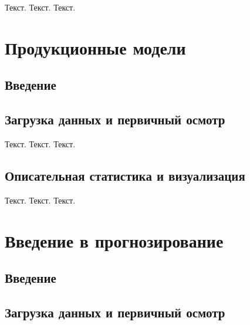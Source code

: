 \documentclass[
  letterpaper,
  DIV=11,
  numbers=noendperiod]{scrreprt}
\begin{document}
Текст. Текст. Текст.


\chapter{Продукционные
модели}\label{ux43fux440ux43eux434ux443ux43aux446ux438ux43eux43dux43dux44bux435-ux43cux43eux434ux435ux43bux438}

\section{Введение}\label{ux432ux432ux435ux434ux435ux43dux438ux435-5}

\section{Загрузка данных и первичный
осмотр}\label{ux437ux430ux433ux440ux443ux437ux43aux430-ux434ux430ux43dux43dux44bux445-ux438-ux43fux435ux440ux432ux438ux447ux43dux44bux439-ux43eux441ux43cux43eux442ux440-2}

Текст. Текст. Текст.

\section{Описательная статистика и
визуализация}\label{ux43eux43fux438ux441ux430ux442ux435ux43bux44cux43dux430ux44f-ux441ux442ux430ux442ux438ux441ux442ux438ux43aux430-ux438-ux432ux438ux437ux443ux430ux43bux438ux437ux430ux446ux438ux44f-3}

Текст. Текст. Текст.


\chapter{Введение в
прогнозирование}\label{ux432ux432ux435ux434ux435ux43dux438ux435-ux432-ux43fux440ux43eux433ux43dux43eux437ux438ux440ux43eux432ux430ux43dux438ux435}

\section{Введение}\label{ux432ux432ux435ux434ux435ux43dux438ux435-6}

\section{Загрузка данных и первичный
осмотр}\label{ux437ux430ux433ux440ux443ux437ux43aux430-ux434ux430ux43dux43dux44bux445-ux438-ux43fux435ux440ux432ux438ux447ux43dux44bux439-ux43eux441ux43cux43eux442ux440-3}
\end{document}
